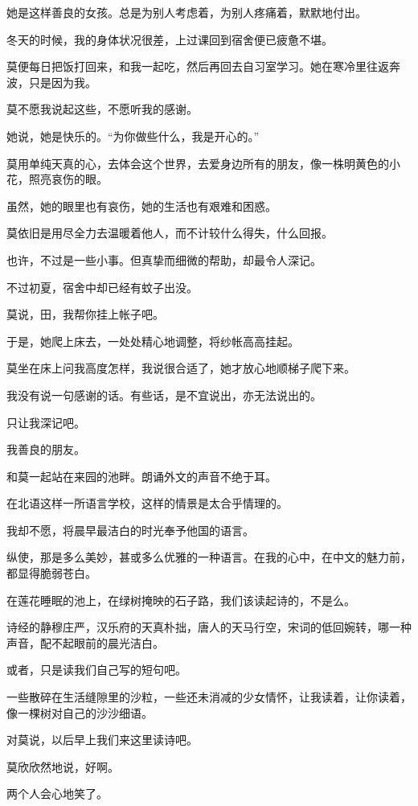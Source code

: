		她是这样善良的女孩。总是为别人考虑着，为别人疼痛着，默默地付出。

		冬天的时候，我的身体状况很差，上过课回到宿舍便已疲惫不堪。\par
		莫便每日把饭打回来，和我一起吃，然后再回去自习室学习。她在寒冷里往返奔波，只是因为我。\par
		莫不愿我说起这些，不愿听我的感谢。\par
		她说，她是快乐的。“为你做些什么，我是开心的。”\par
		莫用单纯天真的心，去体会这个世界，去爱身边所有的朋友，像一株明黄色的小花，照亮哀伤的眼。\par
		虽然，她的眼里也有哀伤，她的生活也有艰难和困惑。\par
		莫依旧是用尽全力去温暖着他人，而不计较什么得失，什么回报。\par
		也许，不过是一些小事。但真挚而细微的帮助，却最令人深记。\par
		不过初夏，宿舍中却已经有蚊子出没。\par
		莫说，田，我帮你挂上帐子吧。\par
		于是，她爬上床去，一处处精心地调整，将纱帐高高挂起。\par
		莫坐在床上问我高度怎样，我说很合适了，她才放心地顺梯子爬下来。\par
		我没有说一句感谢的话。有些话，是不宜说出，亦无法说出的。\par
		只让我深记吧。\par
		我善良的朋友。

		和莫一起站在来园的池畔。朗诵外文的声音不绝于耳。\par
		在北语这样一所语言学校，这样的情景是太合乎情理的。\par
		我却不愿，将晨早最洁白的时光奉予他国的语言。\par
		纵使，那是多么美妙，甚或多么优雅的一种语言。在我的心中，在中文的魅力前，都显得脆弱苍白。\par
		在莲花睡眠的池上，在绿树掩映的石子路，我们该读起诗的，不是么。\par
		诗经的静穆庄严，汉乐府的天真朴拙，唐人的天马行空，宋词的低回婉转，哪一种声音，配不起眼前的晨光洁白。\par
		或者，只是读我们自己写的短句吧。\par
		一些散碎在生活缝隙里的沙粒，一些还未消减的少女情怀，让我读着，让你读着，像一棵树对自己的沙沙细语。\par
		对莫说，以后早上我们来这里读诗吧。\par
		莫欣欣然地说，好啊。\par
		两个人会心地笑了。

